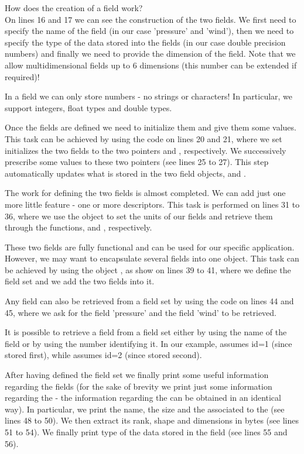 How does the creation of a field work?\\
On lines 16 and 17 we can see the construction of the two fields.
We first need to specify the name of the field (in our case 'pressure' 
and 'wind'), then we need to specify the type of the data stored 
into the fields (in our case double precision numbers) and finally 
we need to provide the dimension of the field.
Note that we allow multidimensional fields up to 6 dimensions 
(this number can be extended if required)!
%
\begin{tipbox}
In a field we can only store numbers - no strings or characters!
In particular, we support integers, float types and double types.
\end{tipbox}
%
Once the fields are defined we need to initialize them 
and give them some values. This task can be achieved 
by using the code on lines 20 and 21, where we set 
initializes the two fields to the two pointers 
and , respectively. 
We successively prescribe some values to these two pointers 
(see lines 25 to 27). This step automatically updates what 
is stored in the two field objects,  
and .

The work for defining the two fields is almost completed.
We can add just one more little feature - one or more 
descriptors. This task is performed on lines 31 to 36, 
where we use the  object to set the units 
of our fields and retrieve them through the functions, 
 and , respectively.

These two fields are fully functional and can be used 
for our specific application. However, we may want to 
encapsulate several fields into one object. This task 
can be achieved by using the object , 
as show on lines 39 to 41, where we define the field 
set and we add the two fields into it.

Any field can also be retrieved from a field set by 
using the code on lines 44 and 45, where we ask for 
the field 'pressure' and the field 'wind' to be retrieved.
%
\begin{notebox}
It is possible to retrieve a field from a field set 
either by using the name of the field or by using 
the number identifying it. In our example,  
assumes id=1 (since stored first), while 
assumes id=2 (since stored second).
\end{notebox}
%
After having defined the field set we finally print some 
useful information regarding the fields (for the sake of 
brevity we print just some information regarding the 
- the information regarding the  can 
be obtained in an identical way).
In particular, we print the name, the size and the 
associated to the  (see lines 48 to 50).
We then extract its rank, shape and dimensions in bytes
(see lines 51 to 54). We finally print type of the data
stored in the field (see lines 55 and 56).

